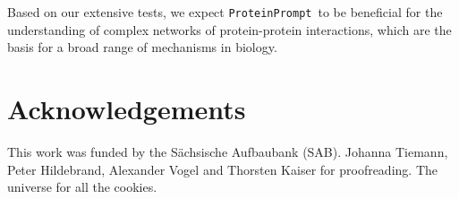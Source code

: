 \documentclass[3p,times,twocolumn]{elsarticle}
\newcommand{\tool}{\texttt{ProteinPrompt}}
\begin{document}
Based on our extensive tests, we expect
\tool\  to be beneficial for the understanding of complex networks of protein-protein interactions,
which are the basis for a broad range of mechanisms in biology.


\section*{Acknowledgements} This work was funded by the S\"achsische Aufbaubank (SAB).
Johanna Tiemann, Peter Hildebrand, Alexander Vogel and Thorsten Kaiser for proofreading.
The universe for all the cookies.




%


\end{document}

